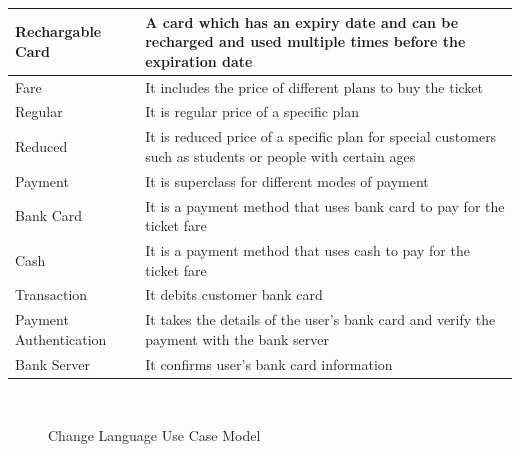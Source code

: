 \documentclass[a4paper,12pt]{report}
\begin{document}
\setlength{\tabcolsep}{18pt}
\renewcommand{\arraystretch}{1.5}
\begin{tabular}[H]{ |p{3cm}|p{12cm}| }
	\hline
	Rechargable Card & A card which has an expiry date and can be recharged and used multiple times before the expiration date
	\\
	\hline
	Fare & It includes the price of different plans to buy the ticket
	\\
	\hline
	Regular & It is regular price of a specific plan
	\\
	\hline
	Reduced & It is reduced price of a specific plan for special customers such as students or people with certain ages
	\\
	\hline
	Payment & It is superclass for different modes of payment
	\\
	\hline
	Bank Card & It is a payment method that uses bank card to pay for the ticket fare
	\\
	\hline
	Cash & It is a payment method that uses cash to pay for the ticket fare
	\\
	\hline
	Transaction & It debits customer bank card  
	\\
	\hline
	Payment Authentication & It takes the details of the user’s bank card and verify the payment with the bank server
	\\
	\hline
	Bank Server & It confirms user’s bank card information
	\\
	\hline
\end{tabular}
\\ 



\begin{figure}[!htb]
	\centering
	\caption{\label{fig:Use Case Model : } Change Language Use Case Model}	
\end{figure}
\end{document}
